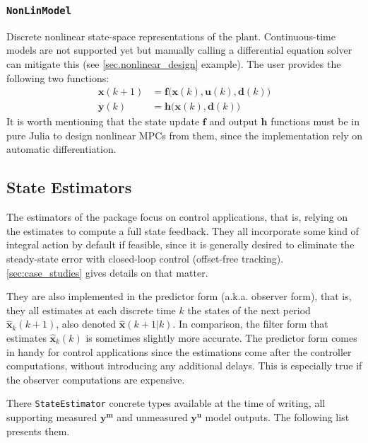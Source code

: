 \subsubsection{\textnormal{\texttt{NonLinModel}}}

Discrete nonlinear state-space representations of the plant. Continuous-time models are not supported yet but manually calling a differential equation solver can mitigate this (see \cref{sec.nonlinear_design} example). The user provides the following two functions:
\begin{subequations}
\begin{align}
    \mathbf{x}(k+1) &= \mathbf{f}\big(\mathbf{x}(k), \mathbf{u}(k), \mathbf{d}(k)\big) \\
    \mathbf{y}(k)   &= \mathbf{h}\big( \mathbf{x}(k), \mathbf{d}(k) \big)
\end{align}
\end{subequations}
It is worth mentioning that the state update $\mathbf{f}$ and output $\mathbf{h}$ functions must be in pure Julia to design nonlinear MPCs from them, since the implementation rely on automatic differentiation.

\subsection{State Estimators}

The estimators of the package focus on control applications, that is, relying on the estimates to compute a full state feedback. They all incorporate some kind of integral action by default if feasible, since it is generally desired to eliminate the steady-state error with closed-loop control (offset-free tracking). \cref{sec:case_studies} gives details on that matter.

They are also implemented in the predictor form (a.k.a. observer form), that is, they all estimates at each discrete time $k$ the states of the next period $\mathbf{\hat{x}}_k(k+1)$, also denoted $\mathbf{\hat{x}}(k+1|k)$. In comparison, the filter form that estimates $\mathbf{\hat{x}}_k(k)$ is sometimes slightly more accurate. The predictor form comes in handy for control applications since the estimations come after the controller computations, without introducing any additional delays. This is especially true if the observer computations are expensive.

There  \texttt{StateEstimator} concrete types available at the time of writing, all supporting measured $\mathbf{y^m}$ and unmeasured $\mathbf{y^u}$ model outputs. The following list presents them.

